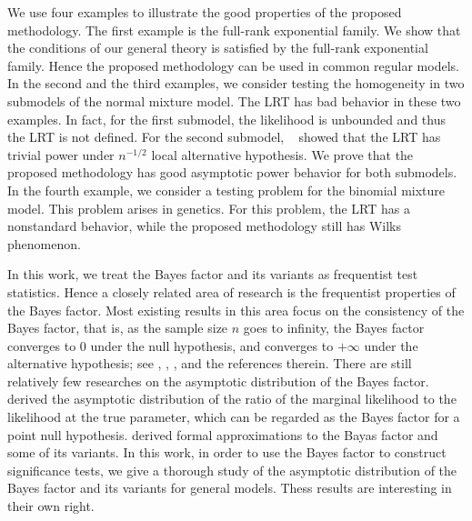 \documentclass[11pt]{article}
\theoremstyle{plain}
\theoremstyle{definition}
\theoremstyle{remark}
\begin{document}
We use four examples to illustrate the good properties of the proposed methodology.
The first example is the full-rank exponential family.
We show that the conditions of our general theory is satisfied by the full-rank exponential family.
Hence the proposed methodology can be used in common regular models.
In the second and the third examples, we consider testing the homogeneity in two submodels of the normal mixture model.
The LRT has bad behavior in these two examples.
In fact, for the first submodel, the likelihood is unbounded and thus the LRT is not defined.
For the second submodel, %
~\cite{HALL2005158} showed that the LRT has trivial power under $n^{-1/2}$ local alternative hypothesis. 
We prove that the proposed methodology has good asymptotic power behavior for both submodels.
In the fourth example, we consider a testing problem for the binomial mixture model.
This problem arises in genetics.
For this problem, the LRT has a nonstandard behavior, while the proposed methodology still has Wilks phenomenon.

In this work, we treat the Bayes factor and its variants as frequentist test statistics.
Hence a closely related area of research is the frequentist properties of the Bayes factor.
Most existing results in this area focus on the consistency of the Bayes factor, that is, as the sample size $n$ goes to infinity, the Bayes factor converges to $0$ under the null hypothesis, and converges to $+\infty$ under the alternative hypothesis; see \cite{berger2003approximations}, \cite{moreno2010}, \cite{WangMin2016}, \cite{Chatterjee2017} and the references therein.
There are still relatively few researches on the asymptotic distribution of the Bayes factor.
\cite{clarke1990information} derived the asymptotic distribution of the ratio of the marginal likelihood to the likelihood at the true parameter, which can be regarded as the Bayes factor for a point null hypothesis.
\cite{Gelfand1994} derived formal approximations to the Bayas factor and some of its variants.
In this work, in order to use the Bayes factor to construct significance tests, we give a thorough study of the asymptotic distribution of the Bayes factor and its variants for general models.
Thess results are interesting in their own right.
\end{document}
